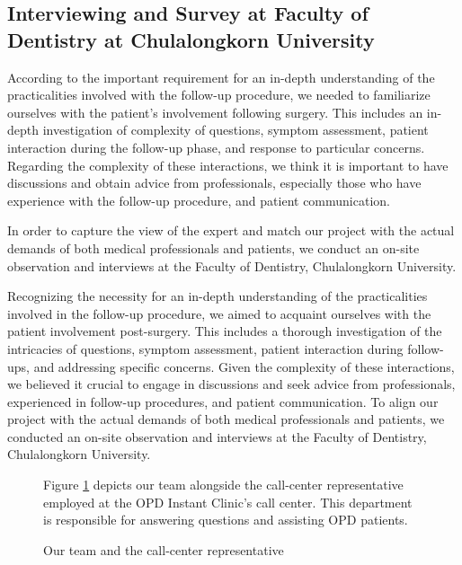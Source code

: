 \documentclass[12pt,oneside,openright,a4paper]{cpe-english-project}
\begin{document}
    \subsection{Interviewing and Survey at Faculty of Dentistry at Chulalongkorn University}
      \qquad According to the important requirement for an in-depth understanding of the practicalities involved with the follow-up procedure, we needed to familiarize ourselves with the patient's involvement following surgery. This includes an in-depth investigation of  complexity of questions, symptom assessment, patient interaction during the follow-up phase, and response to particular concerns. Regarding the complexity of these interactions, we think it is important to have discussions and obtain advice from professionals, especially those who have experience with the follow-up procedure, and patient communication. \par
      \qquad In order to capture the view of the expert and  match our project with the actual demands of both medical professionals and patients, we conduct an on-site observation and interviews at the Faculty of Dentistry, Chulalongkorn University. \par
      \qquad Recognizing the necessity for an in-depth understanding of the practicalities involved in the follow-up procedure, we aimed to acquaint ourselves with the patient involvement post-surgery. This includes a thorough investigation of the intricacies of questions, symptom assessment, patient interaction during follow-ups, and addressing specific concerns. Given the complexity of these interactions, we believed it crucial to engage in discussions and seek advice from professionals, experienced in follow-up procedures, and patient communication. To align our project with the actual demands of both medical professionals and patients, we conducted an on-site observation and interviews at the Faculty of Dentistry, Chulalongkorn University. \par
      \begin{figure}[!h]
        \centering
        \caption{Our team and the call-center representative}\label{fig:Interview_1}
        \begin{justify}
          \qquad Figure \ref{fig:Interview_1} depicts our team alongside the call-center representative employed at the OPD Instant Clinic's call center. This department is responsible for answering questions and assisting OPD patients. \par
        \end{justify}        
      \end{figure}
\end{document}
